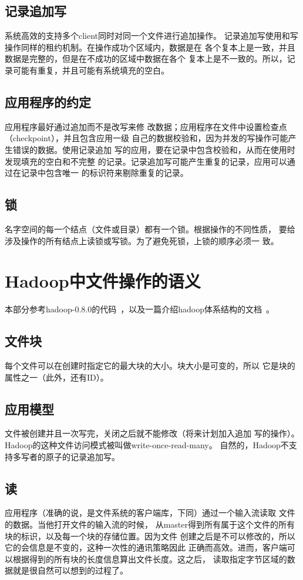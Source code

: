\documentclass[11pt,a4paper]{scrartcl}
\begin{document}
\begin{CJK*}{UTF8}{gbsn}
\subsection{记录追加写}
系统高效的支持多个client同时对同一个文件进行追加操作。
记录追加写使用和写操作同样的租约机制。在操作成功个区域内，数据是在
各个复本上是一致，并且数据是完整的，但是在不成功的区域中数据在各个
复本上是不一致的。所以，记录可能有重复，并且可能有系统填充的空白。

\subsection{应用程序的约定}
应用程序最好通过追加而不是改写来修
改数据；应用程序在文件中设置检查点（checkpoint），并且包含应用一级
自己的数据校验和，因为并发的写操作可能产生错误的数据。使用记录追加
写的应用，要在记录中包含校验和，从而在使用时发现填充的空白和不完整
的记录。记录追加写可能产生重复的记录，应用可以通过在记录中包含唯一
的标识符来剔除重复的记录。
\subsection{锁}
名字空间的每一个结点（文件或目录）都有一个锁。根据操作的不同性质，
要给涉及操作的所有结点上读锁或写锁。为了避免死锁，上锁的顺序必须一
致。
\section{Hadoop中文件操作的语义}
本部分参考hadoop-0.8.0的代码~\cite{hadoop}，以及一篇介绍hadoop体系结构的文档~\cite{hadooparch}。

\subsection{文件块}
每个文件可以在创建时指定它的最大块的大小。块大小是可变的，所以
它是块的属性之一（此外，还有ID）。

\subsection{应用模型}
文件被创建并且一次写完，关闭之后就不能修改（将来计划加入追加
写的操作）。Hadoop的这种文件访问模式被叫做write-once-read-many。
自然的，Hadoop不支持多写者的原子的记录追加写。
\subsection{读}
\label{sec:hadoopread}
应用程序（准确的说，是文件系统的客户端库，下同）通过一个输入流读取
文件的数据。当他打开文件的输入流的时候，
从master得到所有属于这个文件的所有块的标识，以及每一个块的存储位置。因为文件
创建之后是不可以修改的，所以它的会信息是不变的，这种一次性的通讯策略因此
正确而高效。进而，客户端可以根据得到的所有块的长度信息算出文件长度。这之后，
读取指定字节区域的数据就是很自然可以想到的过程了。

\end{CJK*}
\end{document}
